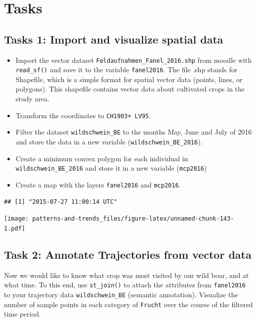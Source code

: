 \documentclass[]{book}
\providecommand{\tightlist}{%
  \setlength{\itemsep}{0pt}\setlength{\parskip}{0pt}}
\begin{document}
\hypertarget{tasks}{%
\section{Tasks}\label{tasks}}

\hypertarget{tasks-1-import-and-visualize-spatial-data}{%
\subsection{Tasks 1: Import and visualize spatial data}\label{tasks-1-import-and-visualize-spatial-data}}

\begin{itemize}
\tightlist
\item
  Import the vector dataset \texttt{Feldaufnahmen\_Fanel\_2016.shp} from moodle with \texttt{read\_sf()} and save it to the variable \texttt{fanel2016}. The file .shp stands for Shapefile, which is a simple format for spatial vector data (points, lines, or polygons). This shapefile contains vector data about cultivated crops in the study area.
\item
  Transform the coordinates to \texttt{CH1903+\ LV95}.
\item
  Filter the dataset \texttt{wildschwein\_BE} to the months May, June and July of 2016 and store the data in a new variable (\texttt{wildschwein\_BE\_2016}).
\item
  Create a minimum convex polygon for each individual in \texttt{wildschwein\_BE\_2016} and store it in a new variable (\texttt{mcp2016})
\item
  Create a map with the layers \texttt{fanel2016} and \texttt{mcp2016}.
\end{itemize}

\begin{verbatim}
## [1] "2015-07-27 11:00:14 UTC"
\end{verbatim}

\texttt{[image: patterns-and-trends\_files/figure-latex/unnamed-chunk-143-1.pdf]}

\hypertarget{task-2-annotate-trajectories-from-vector-data}{%
\subsection{Task 2: Annotate Trajectories from vector data}\label{task-2-annotate-trajectories-from-vector-data}}

Now we would like to know what crop was most visited by our wild boar, and at what time. To this end, use \texttt{st\_join()} to attach the attributes from \texttt{fanel2016} to your trajectory data \texttt{wildschwein\_BE} (semantic annotation). Visualize the number of sample points in each category of \texttt{Frucht} over the course of the filtered time period.
\end{document}

